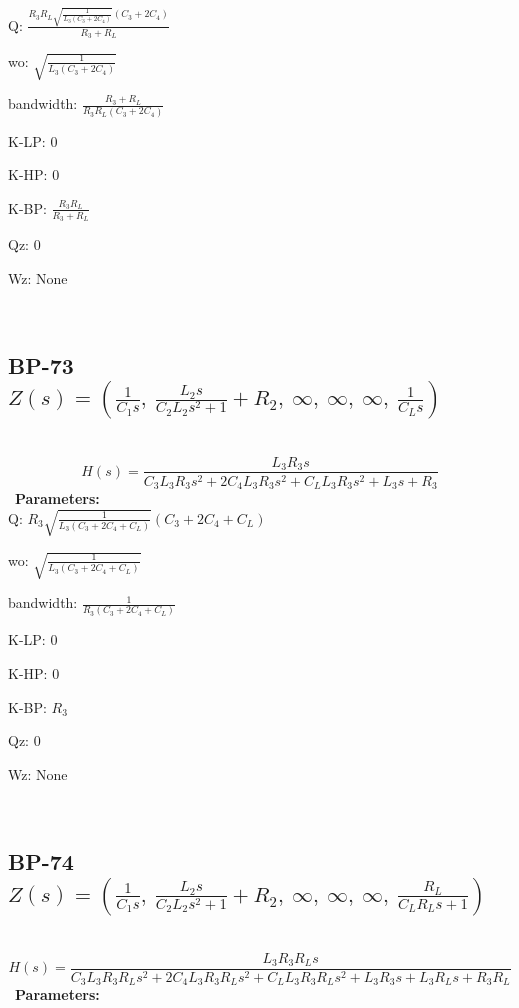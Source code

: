 \documentclass{article}
\begin{document}
Q: $\frac{R_{3} R_{L} \sqrt{\frac{1}{L_{3} \left(C_{3} + 2 C_{4}\right)}} \left(C_{3} + 2 C_{4}\right)}{R_{3} + R_{L}}$\ 

wo: $\sqrt{\frac{1}{L_{3} \left(C_{3} + 2 C_{4}\right)}}$\ 

bandwidth: $\frac{R_{3} + R_{L}}{R_{3} R_{L} \left(C_{3} + 2 C_{4}\right)}$\ 

K-LP: $0$\ 

K-HP: $0$\ 

K-BP: $\frac{R_{3} R_{L}}{R_{3} + R_{L}}$\ 

Qz: $0$\ 

Wz: $\text{None}$\ 

\ 

\subsection{BP-73 $Z(s) = \left( \frac{1}{C_{1} s}, \  \frac{L_{2} s}{C_{2} L_{2} s^{2} + 1} + R_{2}, \  \infty, \  \infty, \  \infty, \  \frac{1}{C_{L} s}\right)$ } \ 
\textbf{\[H(s) = \frac{L_{3} R_{3} s}{C_{3} L_{3} R_{3} s^{2} + 2 C_{4} L_{3} R_{3} s^{2} + C_{L} L_{3} R_{3} s^{2} + L_{3} s + R_{3}}\] } \ 
\textbf{Parameters:}\\ 

Q: $R_{3} \sqrt{\frac{1}{L_{3} \left(C_{3} + 2 C_{4} + C_{L}\right)}} \left(C_{3} + 2 C_{4} + C_{L}\right)$\ 

wo: $\sqrt{\frac{1}{L_{3} \left(C_{3} + 2 C_{4} + C_{L}\right)}}$\ 

bandwidth: $\frac{1}{R_{3} \left(C_{3} + 2 C_{4} + C_{L}\right)}$\ 

K-LP: $0$\ 

K-HP: $0$\ 

K-BP: $R_{3}$\ 

Qz: $0$\ 

Wz: $\text{None}$\ 

\ 

\subsection{BP-74 $Z(s) = \left( \frac{1}{C_{1} s}, \  \frac{L_{2} s}{C_{2} L_{2} s^{2} + 1} + R_{2}, \  \infty, \  \infty, \  \infty, \  \frac{R_{L}}{C_{L} R_{L} s + 1}\right)$ } \ 
\textbf{\[H(s) = \frac{L_{3} R_{3} R_{L} s}{C_{3} L_{3} R_{3} R_{L} s^{2} + 2 C_{4} L_{3} R_{3} R_{L} s^{2} + C_{L} L_{3} R_{3} R_{L} s^{2} + L_{3} R_{3} s + L_{3} R_{L} s + R_{3} R_{L}}\] } \ 
\textbf{Parameters:}\\ 
\end{document}
